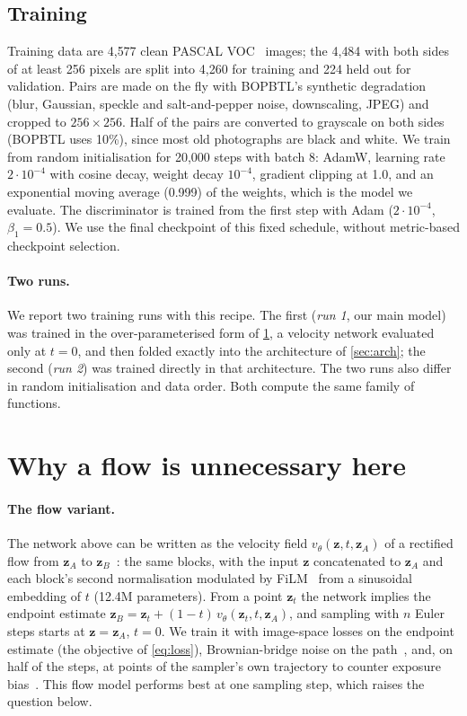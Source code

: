 \documentclass[10pt,twocolumn,letterpaper]{article}
\newcommand{\zA}{\bm{z}_A}
\newcommand{\zB}{\bm{z}_B}
\newcommand{\zt}{\bm{z}_t}
\newcommand{\hzB}{\hat{\bm{z}}_B}
\begin{document}
\subsection{Training}
\label{sec:training}
Training data are 4{,}577 clean PASCAL VOC~\cite{everingham2010pascal} images; the 4{,}484 with both sides of at least
256 pixels are split into 4{,}260 for training and 224 held out for validation. Pairs are made on the fly with BOPBTL's
synthetic degradation (blur, Gaussian, speckle and salt-and-pepper noise, downscaling, JPEG) and cropped to
$256{\times}256$. Half of the pairs are converted to grayscale on both sides (BOPBTL uses 10\%), since most old
photographs are black and white. We train from random initialisation for 20{,}000 steps with batch 8: AdamW, learning
rate $2{\cdot}10^{-4}$ with cosine decay, weight decay $10^{-4}$, gradient clipping at 1.0, and an exponential moving
average (0.999) of the weights, which is the model we evaluate. The discriminator is trained from the first step with
Adam ($2{\cdot}10^{-4}$, $\beta_1=0.5$). We use the final checkpoint of this fixed schedule, without metric-based
checkpoint selection.

\paragraph{Two runs.} We report two training runs with this recipe. The first (\emph{run 1}, our main model) was
trained in the over-parameterised form of \cref{sec:flow}, a velocity network evaluated only at $t{=}0$, and then folded
exactly into the architecture of \cref{sec:arch}; the second (\emph{run 2}) was trained directly in that architecture.
The two runs also differ in random initialisation and data order. Both compute the same family of functions.

\section{Why a flow is unnecessary here}
\label{sec:flow}

\paragraph{The flow variant.} The network above can be written as the velocity field $v_\theta(\bm{z},t,\zA)$ of a rectified
flow from $\zA$ to $\zB$~\cite{liu2023flow}: the same blocks, with the input $\bm{z}$ concatenated to $\zA$ and each
block's second normalisation modulated by FiLM~\cite{perez2018film} from a sinusoidal embedding of $t$
(12.4M parameters). From a point $\zt$ the network implies the endpoint estimate $\hzB=\zt+(1-t)\,v_\theta(\zt,t,\zA)$,
and sampling with $n$ Euler steps starts at $\bm{z}=\zA$, $t=0$. We train it with image-space losses on the endpoint
estimate (the objective of \cref{eq:loss}), Brownian-bridge noise on the path~\cite{liu2023i2sb,shi2023dsbm}, and, on
half of the steps, at points of the sampler's own trajectory to counter exposure
bias~\cite{bengio2015scheduled,ross2011dagger,ning2023input}. This flow model performs best at one sampling step,
which raises the question below.
\end{document}
